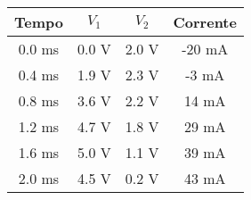 \begin{tabular}{cccc}
\toprule
        Tempo &           $V_1$ &           $V_2$ &      Corrente \\
\midrule
 0.0 \si{\ms} &  0.0 \si{\volt} &  2.0 \si{\volt} &  -20 \si{\mA} \\
 0.4 \si{\ms} &  1.9 \si{\volt} &  2.3 \si{\volt} &   -3 \si{\mA} \\
 0.8 \si{\ms} &  3.6 \si{\volt} &  2.2 \si{\volt} &   14 \si{\mA} \\
 1.2 \si{\ms} &  4.7 \si{\volt} &  1.8 \si{\volt} &   29 \si{\mA} \\
 1.6 \si{\ms} &  5.0 \si{\volt} &  1.1 \si{\volt} &   39 \si{\mA} \\
 2.0 \si{\ms} &  4.5 \si{\volt} &  0.2 \si{\volt} &   43 \si{\mA} \\
\bottomrule
\end{tabular}
